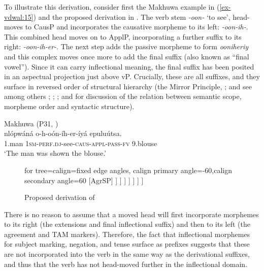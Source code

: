 \documentclass[output=paper
,modfonts
,nonflat]{langsci/langscibook}
\begin{document}
To illustrate this derivation, consider first the Makhuwa example in (\ref{ex-vdwal:15}) and the proposed derivation in . The verb stem \textit{-oon-} ‘to see’, head-moves to CausP and incorporates the causative morpheme to its left: \textit{-oon-ih-}. This combined head moves on to ApplP, incorporating a further suffix to its right: \textit{-oon-ih-er-}. The next step adds the passive morpheme to form \textit{ooniheriy} and this complex moves once more to add the final suffix (also known as ``final vowel''). Since it can carry inflectional meaning, the final suffix has been posited in an aspectual projection just above vP. Crucially, these are all suffixes, and they surface in reversed order of structural hierarchy (the Mirror Principle, \citealt{Baker1985, Baker1988}; and see among others \citealt{Alsina1999}; \citealt{Hyman2003}; \citealt{Good2005}; and \citealt{Muriungi2008} for discussion of the relation between semantic scope, morpheme order and syntactic structure).


\begin{exe}
\ex Makhuwa (P31, \citealt[169]{Van_der_Wal2009})\label{ex-vdwal:15}\\ 
	\gll nlópwáná o-h-oón-íh-er-íyá epuluútsa.\\
	1.man 1\textsc{sm}-\textsc{perf}.\textsc{dj}-see-\textsc{caus}-\textsc{appl}-\textsc{pass}-\textsc{fv} 9.blouse\\
	\glt `The man was shown the blouse.'
\end{exe}

\begin{figure}
\caption{Proposed derivation of \label{ex-vdwal:16}}
		\begin{forest} for tree={calign=fixed edge angles, calign primary angle=-60,calign secondary angle=60}
			[AgrSP\footnotemark
			[o-] 
			[TP 
			[-h-] 
			[AspP
			[{[} {[} {[} {[} {[} -oon{]} \textsubscript{i}ih{]}\textsubscript{j}er{]}\textsubscript{k}iy{]}\textsubscript{m}a{]}]
			[vP
			[t]
			[PassP
			[t\textsubscript{m}]
			[ApplP
			[t\textsubscript{k}]
			[CausP
			[t\textsubscript{j}]
			[VP
			[t\textsubscript{i}]
			[epuluutsa
			] ] ] ]	] ] ] ] ]			
	\end{forest}
\end{figure}

There is no reason to assume that a moved head will first incorporate morphemes to its right (the extensions and final inflectional suffix) and then to its left (the agreement and TAM markers). Therefore, the fact that inflectional morphemes for subject marking, negation, and tense surface as prefixes suggests that these are not incorporated into the verb in the same way as the derivational suffixes, and thus that the verb has not head-moved further in the inflectional domain.
\end{document}
